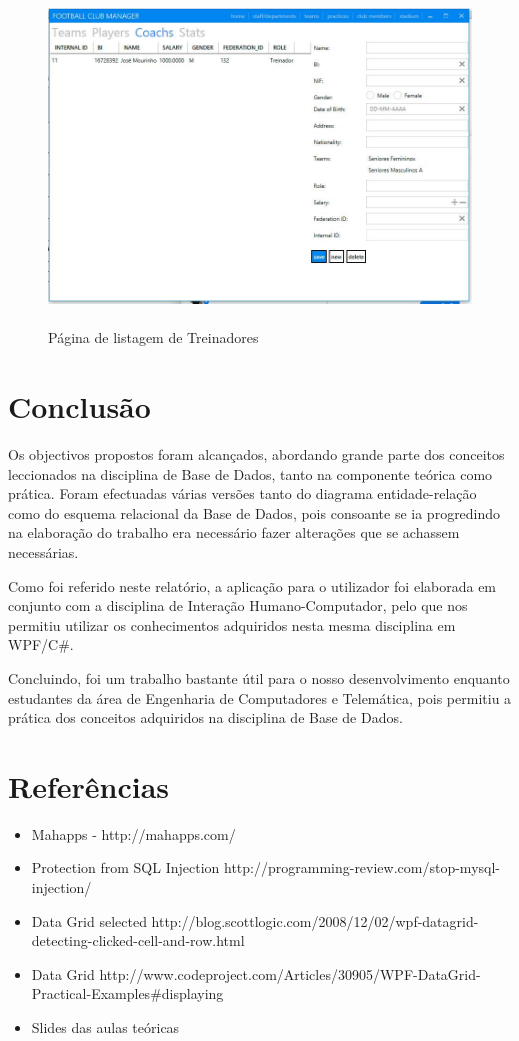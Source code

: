 \documentclass[pdftex,12pt,a4paper]{report}
\begin{document}
\begin{figure}[!htb]
 \includegraphics[width=135mm,scale=1]{app_add_coach.jpg}
 \caption{\\Página de listagem de Treinadores}\label{fig:eer}
\end{figure}


\clearpage
\section{Conclusão}
Os objectivos propostos foram alcançados, abordando grande parte dos conceitos leccionados na disciplina de Base de Dados, tanto na componente teórica como prática.
Foram efectuadas várias versões tanto do diagrama entidade-relação como do esquema relacional da Base de Dados, pois consoante se ia progredindo na elaboração do trabalho era necessário fazer alterações que se achassem necessárias.

Como foi referido neste relatório, a aplicação para o utilizador foi elaborada em conjunto com  a disciplina de Interação Humano-Computador, pelo que nos permitiu utilizar os conhecimentos adquiridos nesta mesma disciplina em WPF/C\#.

Concluindo, foi um trabalho bastante útil para o nosso desenvolvimento enquanto estudantes da área de Engenharia de Computadores e Telemática, pois permitiu a prática dos conceitos adquiridos na disciplina de Base de Dados.

\newpage
\section{Referências}

\begin{itemize}
	\item Mahapps - http://mahapps.com/ 
	\item Protection from SQL Injection http://programming-review.com/stop-mysql-injection/ 
	\item Data Grid selected http://blog.scottlogic.com/2008/12/02/wpf-datagrid-detecting-clicked-cell-and-row.html 
	\item Data Grid http://www.codeproject.com/Articles/30905/WPF-DataGrid-Practical-Examples\#displaying 
	\item Slides das aulas teóricas
\end{itemize}
\end{document}
